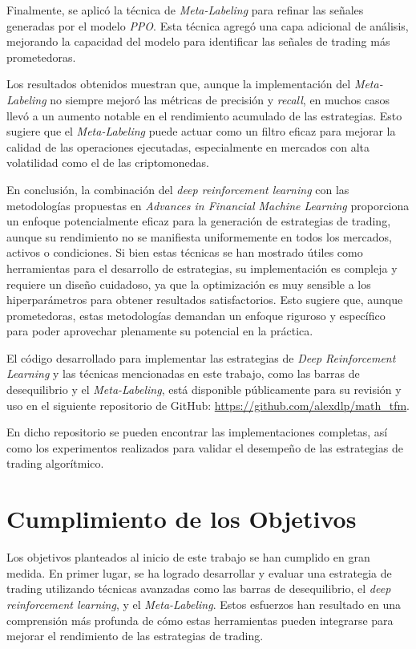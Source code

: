 \documentclass[a4paper,12pt, twoside]{report}
\begin{document}
Finalmente, se aplicó la técnica de \textit{Meta-Labeling} para refinar las señales generadas por el 
modelo \textit{PPO}. Esta técnica agregó una capa adicional de análisis, mejorando la 
capacidad del modelo para identificar las señales de trading más prometedoras. 

Los resultados obtenidos muestran que, aunque la implementación del \textit{Meta-Labeling} 
no siempre mejoró las métricas de precisión y \textit{recall}, en muchos casos llevó a un 
aumento notable en el rendimiento acumulado de las estrategias. Esto sugiere que el 
\textit{Meta-Labeling} puede actuar como un filtro eficaz para mejorar la calidad de las 
operaciones ejecutadas, especialmente en mercados con alta volatilidad como el de las 
criptomonedas.


En conclusión, la combinación del \textit{deep reinforcement learning} con las metodologías 
propuestas en \textit{Advances in Financial Machine Learning} proporciona un enfoque 
potencialmente eficaz para la generación de estrategias de trading, aunque su rendimiento no se 
manifiesta uniformemente en todos los mercados, activos o condiciones. Si bien estas 
técnicas se han mostrado útiles como herramientas para el desarrollo de estrategias, 
su implementación es compleja y requiere un diseño cuidadoso, ya que la optimización es 
muy sensible a los hiperparámetros para obtener resultados satisfactorios. Esto sugiere que, 
aunque prometedoras, estas metodologías demandan un enfoque riguroso y específico para 
poder aprovechar plenamente su potencial en la práctica.


El código desarrollado para implementar las estrategias de \textit{Deep Reinforcement Learning} 
y las técnicas mencionadas en este trabajo, como las barras de desequilibrio y el \textit{Meta-Labeling}, 
está disponible públicamente para su revisión y uso en el 
siguiente repositorio de GitHub: \url{https://github.com/alexdlp/math_tfm}. 

En dicho repositorio se pueden encontrar las implementaciones completas, así como los 
experimentos realizados para validar el desempeño de las estrategias de trading algorítmico.


\section{Cumplimiento de los Objetivos}

Los objetivos planteados al inicio de este trabajo se han cumplido en gran medida. En 
primer lugar, se ha logrado desarrollar y evaluar una estrategia de trading utilizando 
técnicas avanzadas como las barras de desequilibrio, el \textit{deep reinforcement learning}, 
y el \textit{Meta-Labeling}. Estos esfuerzos han resultado en una comprensión más profunda 
de cómo estas herramientas pueden integrarse para mejorar el rendimiento de las estrategias 
de trading.
\end{document}
